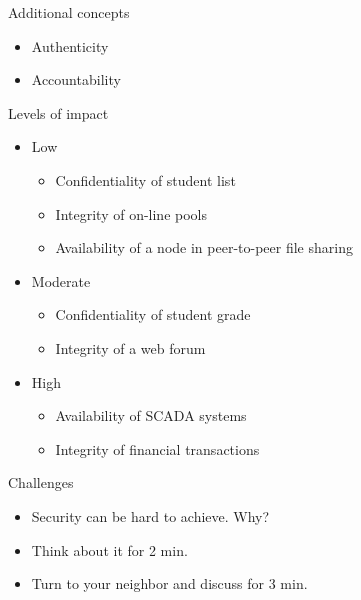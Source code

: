 \documentclass{beamer}
\begin{document}
\begin{frame}{Additional concepts}
  \begin{itemize}
  \item Authenticity
  \item Accountability
  \end{itemize}
\end{frame}  

\begin{frame}{Levels of impact}
  \begin{itemize}
  \item Low
    \begin{itemize}
      \item Confidentiality of student list
      \item Integrity of on-line pools
      \item Availability of a node in peer-to-peer file sharing
    \end{itemize}
  \item Moderate    
    \begin{itemize}
      \item Confidentiality of student grade
      \item Integrity of a web forum
    \end{itemize}
  \item High
    \begin{itemize}
      \item Availability of SCADA systems
      \item Integrity of financial transactions
    \end{itemize}
  \end{itemize}
\end{frame}

\begin{frame}{Challenges}
  \begin{itemize}
  \item Security can be hard to achieve. Why? 
  \item Think about it for 2 min. 
  \item Turn to your neighbor and discuss for 3 min.
  \end{itemize}
\end{frame}
 
\end{document}
